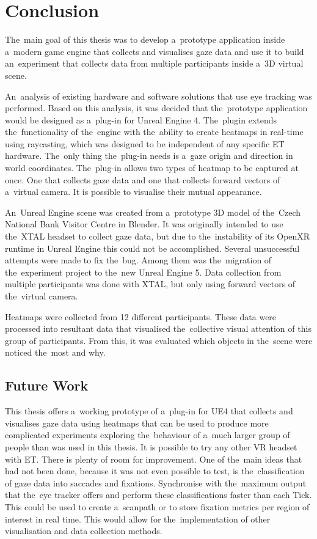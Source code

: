 \documentclass[english,bachelor,unicode]{ctufit-thesis}
\theoremstyle{plain}
\theoremstyle{definition}
\theoremstyle{remark}
\numberwithin{theorem}{chapter}
\begin{document}
\chapter{Conclusion}

The~main goal of this thesis was to develop a~prototype application inside a~modern game engine that collects and visualises gaze data and use it to build an~experiment that collects data from multiple participants inside a~3D virtual scene. 

An~analysis of existing hardware and software solutions that use eye tracking was performed. Based on this analysis, it was decided that the~prototype application would be designed as a~plug-in for Unreal Engine 4. The~plugin extends the~functionality of the~engine with the~ability to create heatmaps in real-time using raycasting, which was designed to be independent of any specific ET hardware. The~only thing the~plug-in needs is a~gaze origin and direction in world coordinates. The~plug-in allows two types of heatmap to be captured at once. One that collects gaze data and one that collects forward vectors of a~virtual camera. It is possible to visualise their mutual appearance. 

An~Unreal Engine scene was created from a~prototype 3D model of the~Czech National Bank Visitor Centre in Blender. It was originally intended to use the~XTAL headset to collect gaze data, but due to the~instability of its OpenXR runtime in Unreal Engine this could not be accomplished. Several unsuccessful attempts were made to fix the~bug. Among them was the~migration of the~experiment project to the~new Unreal Engine 5. Data collection from multiple participants was done with XTAL, but only using forward vectors of the~virtual camera.

Heatmaps were collected from 12 different participants. These data were processed into resultant data that visualised the~collective visual attention of this group of participants. From this, it was evaluated which objects in the~scene were noticed the~most and why. 


\section*{Future Work}

This thesis offers a~working prototype of a~plug-in for UE4 that collects and visualises gaze data using heatmaps that can be used to produce more complicated experiments exploring the~behaviour of a~much larger group of people than was used in this thesis. It is possible to try any other VR headset with ET. There is plenty of room for improvement. One of the~main ideas that had not been done, because it was not even possible to test, is the~classification of gaze data into saccades and fixations. Synchronise with the~maximum output that the~eye tracker offers and perform these classifications faster than each Tick. This could be used to create a~scanpath or to store fixation metrics per region of interest in real time. This would allow for the~implementation of other visualisation and data collection methods.
\end{document}
